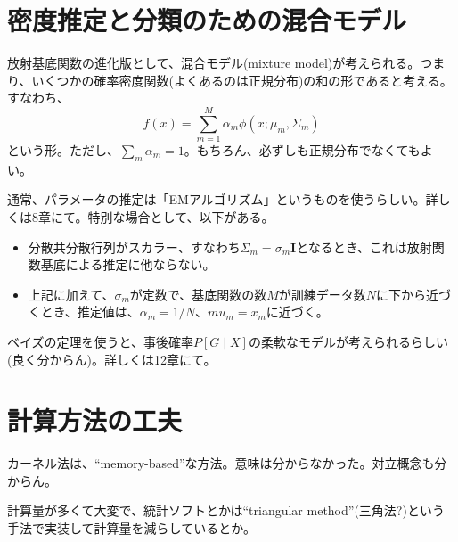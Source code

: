 \documentclass{jsarticle}
\begin{document}
\section{密度推定と分類のための混合モデル}
放射基底関数の進化版として、混合モデル(mixture model)が考えられる。つまり、いくつかの確率密度関数(よくあるのは正規分布)の和の形であると考える。すなわち、
\[
  f(x)=\sum_{m=1}^{M}\alpha_{m}\phi(x;\mu_{m},\Sigma_{m})
\]
という形。ただし、$\sum_{m}\alpha_{m}=1$。もちろん、必ずしも正規分布でなくてもよい。

通常、パラメータの推定は「EMアルゴリズム」というものを使うらしい。詳しくは8章にて。特別な場合として、以下がある。
\begin{itemize}
  \item 分散共分散行列がスカラー、すなわち$\Sigma_m=\sigma_m\mathbf{I}$となるとき、これは放射関数基底による推定に他ならない。

  \item 上記に加えて、$\sigma_m$が定数で、基底関数の数$M$が訓練データ数$N$に下から近づくとき、推定値は、$\alpha_m=1/N$、$mu_m=x_m$に近づく。
\end{itemize}

ベイズの定理を使うと、事後確率$P[G\mid X]$の柔軟なモデルが考えられるらしい(良く分からん)。詳しくは12章にて。

\section{計算方法の工夫}
カーネル法は、``memory-based''な方法。意味は分からなかった。対立概念も分からん。

計算量が多くて大変で、統計ソフトとかは``triangular method''(三角法?)という手法で実装して計算量を減らしているとか。
\end{document}

